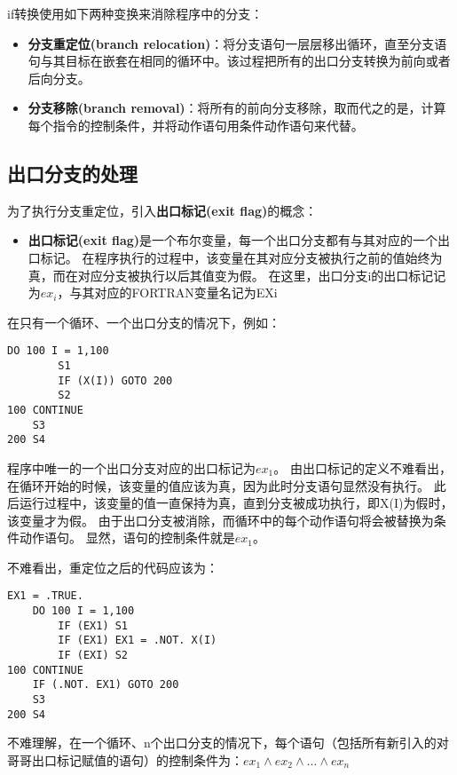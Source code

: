 \documentclass[11pt,a4paper]{article}
\begin{document}
if转换使用如下两种变换来消除程序中的分支：

\begin{itemize}
\item \textbf{分支重定位(branch relocation)}：将分支语句一层层移出循环，直至分支语句与其目标在嵌套在相同的循环中。该过程把所有的出口分支转换为前向或者后向分支。
\item \textbf{分支移除(branch removal)}：将所有的前向分支移除，取而代之的是，计算每个指令的控制条件，并将动作语句用条件动作语句来代替。
\end{itemize}

\subsection{出口分支的处理}

为了执行分支重定位，引入\textbf{出口标记(exit flag)}的概念：
\begin{itemize}
\item \textbf{出口标记(exit flag)}是一个布尔变量，每一个出口分支都有与其对应的一个出口标记。
在程序执行的过程中，该变量在其对应分支被执行之前的值始终为真，而在对应分支被执行以后其值变为假。
在这里，出口分支i的出口标记记为$ex_i$，与其对应的FORTRAN变量名记为EXi
\end{itemize}

在只有一个循环、一个出口分支的情况下，例如：
\begin{lstlisting}[language=FORTRAN]
	DO 100 I = 1,100
		S1
		IF (X(I)) GOTO 200
		S2
100	CONTINUE
	S3
200 S4
\end{lstlisting}

程序中唯一的一个出口分支对应的出口标记为$ex_1$。
由出口标记的定义不难看出，在循环开始的时候，该变量的值应该为真，因为此时分支语句显然没有执行。
此后运行过程中，该变量的值一直保持为真，直到分支被成功执行，即X(I)为假时，该变量才为假。
由于出口分支被消除，而循环中的每个动作语句将会被替换为条件动作语句。
显然，语句的控制条件就是$ex_1$。

不难看出，重定位之后的代码应该为：
\begin{lstlisting}[language=FORTRAN]
	EX1 = .TRUE.
	DO 100 I = 1,100
		IF (EX1) S1
		IF (EX1) EX1 = .NOT. X(I)
		IF (EXI) S2
100	CONTINUE
	IF (.NOT. EX1) GOTO 200
	S3
200	S4
\end{lstlisting}

不难理解，在一个循环、n个出口分支的情况下，每个语句（包括所有新引入的对哥哥出口标记赋值的语句）的控制条件为：$ex_1\wedge{}ex_2\wedge\ldots{}\wedge{}ex_n$
\end{document}
